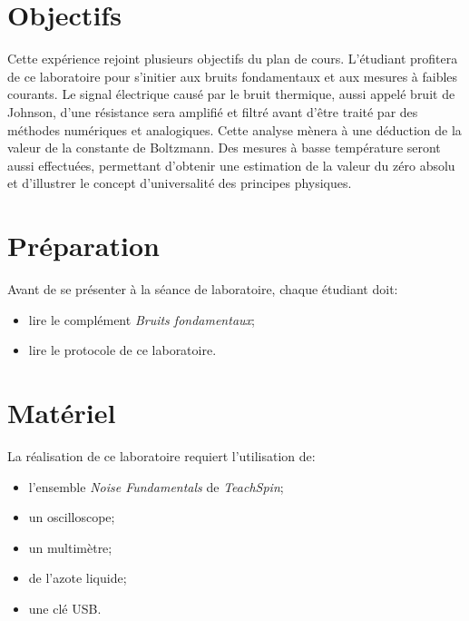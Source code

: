 \documentclass[12pt,oneside,letterpaper]{article}
\begin{document}
\title{}
\author{Claudine Allen, Samuel Tremblay \& Jean-Raphaël Carrier}
\date{}
\maketitle



\section{Objectifs}

Cette expérience rejoint plusieurs objectifs du plan de cours. L'étudiant profitera de ce laboratoire pour s'initier aux bruits fondamentaux et aux mesures à faibles courants. Le signal électrique causé par le bruit thermique, aussi appelé bruit de Johnson, d'une résistance sera amplifié et filtré avant d'être traité par des méthodes numériques et analogiques. Cette analyse mènera à une déduction de la valeur de la constante de Boltzmann. Des mesures à basse température seront aussi effectuées, permettant d'obtenir une estimation de la valeur du zéro absolu et d'illustrer le concept d'universalité des principes physiques.



\section{Préparation}

Avant de se présenter à la séance de laboratoire, chaque étudiant doit:
\begin{itemize}
\item lire le complément \textit{Bruits fondamentaux};
\item lire le protocole de ce laboratoire.
\end{itemize}



\section{Matériel}

La réalisation de ce laboratoire requiert l'utilisation de:
\begin{itemize}
\item l'ensemble \textit{Noise Fundamentals} de \textit{TeachSpin};
\item un oscilloscope;
\item un multimètre;
\item de l'azote liquide;
\item une clé USB.
\end{itemize}
\end{document}
